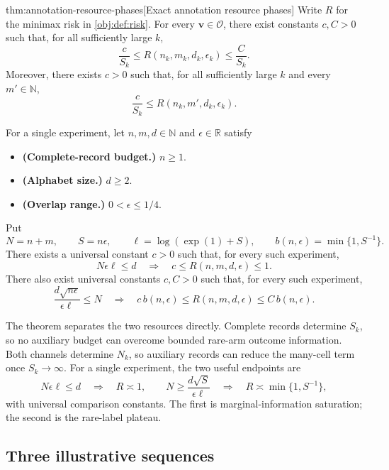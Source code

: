 \documentclass[11pt]{article}
\begin{document}
\begin{theoremv}{thm:annotation-resource-phases}[Exact annotation resource phases]
Write \(R\) for the minimax risk in \cref{obj:def:risk}. For every \(\mathbf v\in\mathcal O\), there exist constants \(c,C>0\) such that, for all sufficiently large \(k\),
\[
\frac{c}{S_k}
\le R(n_k,m_k,d_k,\epsilon_k)
\le \frac{C}{S_k}.
\]
Moreover, there exists \(c>0\) such that, for all sufficiently large \(k\) and every \(m'\in\mathbb N\),
\[
\frac{c}{S_k}\le R(n_k,m',d_k,\epsilon_k).
\]

For a single experiment, let \(n,m,d\in\mathbb N\) and \(\epsilon\in\mathbb R\) satisfy
\begin{itemize}
\item \textbf{(Complete-record budget.)} \(n\ge1\).
\item \textbf{(Alphabet size.)} \(d\ge2\).
\item \textbf{(Overlap range.)} \(0<\epsilon\le1/4\).
\end{itemize}
Put
\[
N=n+m,\qquad S=n\epsilon,\qquad
\ell=\log(\exp(1)+S),\qquad
b(n,\epsilon)=\min\{1,S^{-1}\}.
\]
There exists a universal constant \(c>0\) such that, for every such experiment,
\[
N\epsilon\ell\le d
\quad\Longrightarrow\quad
c\le R(n,m,d,\epsilon)\le1.
\]
There also exist universal constants \(c,C>0\) such that, for every such experiment,
\[
\frac{d\sqrt{n\epsilon}}{\epsilon\ell}\le N
\quad\Longrightarrow\quad
c\,b(n,\epsilon)\le R(n,m,d,\epsilon)\le C\,b(n,\epsilon).
\]
\end{theoremv}

The theorem separates the two resources directly. Complete records determine \(S_k\), so no auxiliary budget can overcome bounded rare-arm outcome information. Both channels determine \(N_k\), so auxiliary records can reduce the many-cell term once \(S_k\to\infty\). For a single experiment, the two useful endpoints are
\[
N\epsilon\ell\le d
\quad\Longrightarrow\quad R\asymp1,
\qquad
N\ge \frac{d\sqrt S}{\epsilon\ell}
\quad\Longrightarrow\quad
R\asymp \min\{1,S^{-1}\},
\]
with universal comparison constants. The first is marginal-information saturation; the second is the rare-label plateau.

\subsection{Three illustrative sequences}
\end{document}
